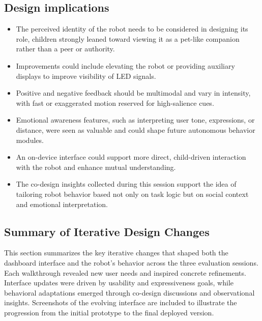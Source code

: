 \documentclass[a4paper]{usiinfbachelorproject}
\begin{document}
\subsection*{\textbf{Design implications}}
\begin{itemize}
    \item The perceived identity of the robot needs to be considered in designing its role, children strongly leaned toward viewing it as a pet-like companion rather than a peer or authority.
    \item Improvements could include elevating the robot or providing auxiliary displays to improve visibility of LED signals.
    \item Positive and negative feedback should be multimodal and vary in intensity, with fast or exaggerated motion reserved for high-salience cues.
    \item Emotional awareness features, such as interpreting user tone, expressions, or distance, were seen as valuable and could shape future autonomous behavior modules.
    \item An on-device interface could support more direct, child-driven interaction with the robot and enhance mutual understanding.
    \item The co-design insights collected during this session support the idea of tailoring robot behavior based not only on task logic but on social context and emotional interpretation.
\end{itemize}


\subsection{\textbf{Summary of Iterative Design Changes}}

This section summarizes the key iterative changes that shaped both the dashboard interface and the robot's behavior across the three evaluation sessions.
Each walkthrough revealed new user needs and inspired concrete refinements.
Interface updates were driven by usability and expressiveness goals, while behavioral adaptations emerged through co-design discussions and observational insights.
Screenshots of the evolving interface are included to illustrate the progression from the initial prototype to the final deployed version.
\end{document}
